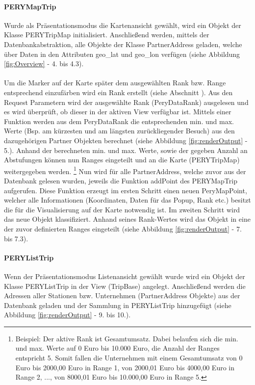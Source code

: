 \documentclass[Bachelorarbeit.tex]{subfiles}
\begin{document}
\paragraph{PERYMapTrip}
\label{PERYMapTrip}
Wurde als Präsentationsmodus die Kartenansicht gewählt, wird ein Objekt der Klasse PERYTripMap initialisiert. 
Anschließend werden, mittels der Datenbankabstraktion, alle Objekte der Klasse PartnerAddress geladen, welche über Daten in den Attributen geo\_lat und geo\_lon verfügen (siehe Abbildung \ref{fig:Overview} - 4. bis 4.3). \\
\\
Um die Marker auf der Karte später dem ausgewählten Rank bzw. Range entsprechend einzufärben wird ein Rank erstellt (siehe Abschnitt ). 
Aus den Request Parametern wird der ausgewählte Rank (PeryDataRank) ausgelesen und es wird überprüft, ob dieser in der aktiven View verfügbar ist.
Mittels einer Funktion werden aus dem PeryDataRank die entsprechenden min. und max. Werte (Bsp. am kürzesten und am längsten zurückliegender Besuch) aus den dazugehörigen Partner Objekten berechnet (siehe Abbildung \ref{fig:renderOutput} - 5.).
Anhand der berechneten min. und max. Werte, sowie der gegeben Anzahl an Abstufungen können nun Ranges eingeteilt und an die Karte (PERYTripMap) weitergegeben werden.
	\footnote{Beispiel: Der aktive Rank ist Gesamtumsatz. Dabei belaufen sich die min. und max. Werte auf 0 Euro bis 10.000 Euro, die Anzahl der Ranges entspricht 5. Somit fallen die Unternehmen mit einem Gesamtumsatz von 0 Euro bis 2000,00 Euro in Range 1, von 2000,01 Euro bis 4000,00 Euro in Range 2, ..., von 8000,01 Euro bis 10.000,00 Euro in Range 5.} 
Nun wird für alle PartnerAddress, welche zuvor aus der Datenbank gelesen wurden, jeweils die Funktion addPoint des PERYMapTrip  aufgerufen. 
Diese Funktion erzeugt im ersten Schritt einen neuen PeryMapPoint, welcher alle Informationen (Koordinaten, Daten für das Popup, Rank etc.) besitzt die für die Visualisierung auf der Karte notwendig ist.
Im zweiten Schritt wird das neue Objekt klassifiziert.
Anhand seines Rank-Wertes wird das Objekt in eine der zuvor definierten Ranges eingeteilt (siehe Abbildung \ref{fig:renderOutput} - 7. bis 7.3).

\paragraph{PERYListTrip}
\label{PERYListTrip}
Wenn der Präsentationsmodus Listenansicht gewählt wurde wird ein Objekt der Klasse PERYListTrip in der View (TripBase) angelegt.
Anschließend werden die Adressen aller Stationen bzw. Unternehmen (PartnerAddress Objekte) aus der Datenbank geladen und der Sammlung in PERYListTrip hinzugefügt (siehe Abbildung \ref{fig:renderOutput} - 9. bis 10.).
\end{document}
